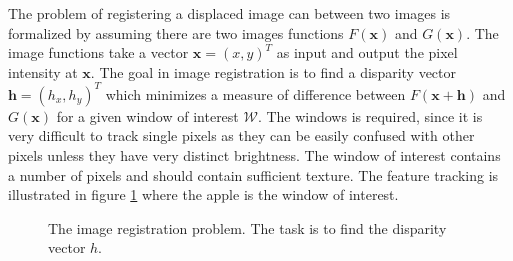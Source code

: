 \documentclass[11pt,a4paper]{report}
\begin{document}
The problem of registering a displaced image can between two images is
formalized by assuming there are two images functions $F(\mathbf{x})$ and $G(\mathbf{x})$. The image
functions take a vector $\mathbf{x} = (x,y)^T$ as input
and output the pixel intensity at $\mathbf{x}$. The goal in image registration
is to find a disparity vector $\mathbf{h} = (h_x,h_y)^T$ which minimizes
a measure of difference between $F(\mathbf{x + h})$ and $G(\mathbf{x})$ for a given window of
interest $\mathcal{W}$. The windows is required, since it is very difficult to
track single pixels as they can be easily confused with other pixels unless they
have very distinct brightness. The window of interest contains a number of
pixels and should contain sufficient texture. The feature tracking is
illustrated in figure \ref{fg:apple} where the apple is the window of interest.

\begin{figure}[H] 
\centering
\setlength\fboxsep{0.5pt}
\setlength\fboxrule{0.5pt}
\label{fg:apple}
\caption{ The image registration problem. The task is to find the disparity
  vector $h$.}
\end{figure}
\end{document}
